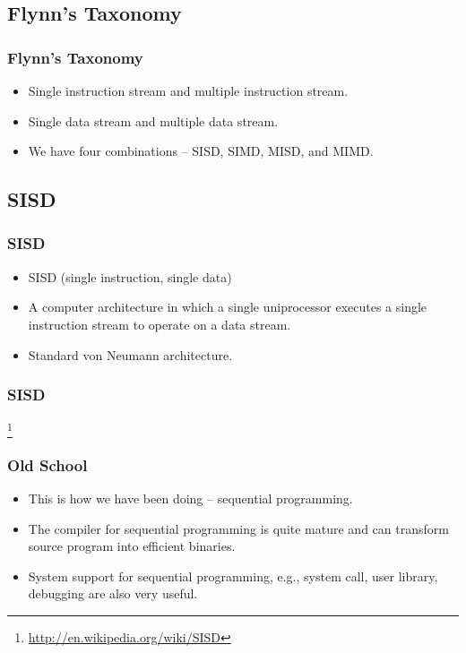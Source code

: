 \documentclass{beamer}
\begin{document}
\begin{CJK}{UTF8}{bsmi}
\section{Flynn's Taxonomy}

\begin{frame}
\frametitle{Flynn's Taxonomy}
\begin{itemize}
\item Single instruction stream and multiple instruction stream.
\item Single data stream and multiple data stream.
\item We have four combinations -- SISD, SIMD, MISD, and MIMD.
\end{itemize}
\end{frame}

\subsection{SISD}

\begin{frame}
\frametitle{SISD}
\begin{itemize}
\item SISD (single instruction, single data) 
\item A computer architecture in which a single uniprocessor executes
  a single instruction stream to operate on a data stream.
\item Standard von Neumann architecture.
\end{itemize}
\end{frame}

\begin{frame}
\frametitle{SISD}
\centerline{}
\footnote{\url{http://en.wikipedia.org/wiki/SISD}}
\end{frame}

\begin{frame}
\frametitle{Old School}
\begin{itemize}
\item This is how we have been doing -- sequential programming.
\item The compiler for sequential programming is quite mature and can
  transform source program into efficient binaries.
\item System support for sequential programming, e.g., system call,
  user library, debugging are also very useful.
\end{itemize}
\end{frame}


\end{CJK}
\end{document}
